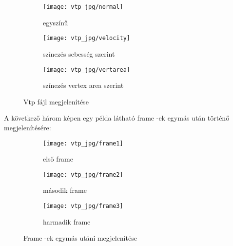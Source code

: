 \begin{figure}[!htb]
    \centering
    \begin{subfigure}[!htb]{0.32\textwidth}
        \centering
        \texttt{[image: vtp\_jpg/normal]}
        \caption{egyszínű}
    \end{subfigure}
    \hfill
    \begin{subfigure}[!htb]{0.32\textwidth}
        \centering
        \texttt{[image: vtp\_jpg/velocity]}
        \caption{színezés sebesség szerint}
    \end{subfigure}
    \hfill
    \begin{subfigure}[!htb]{0.32\textwidth}
        \centering
        \texttt{[image: vtp\_jpg/vertarea]}
        \caption{színezés vertex area szerint}
    \end{subfigure}
    \caption{Vtp fájl megjelenítése}
    \label{fig:x vtpcoloring}
\end{figure}

\clearpage
\noindent A következő három képen egy példa látható 
frame -ek egymás után történő megjelenítésére:

\begin{figure}[!htb]
    \centering
    \begin{subfigure}[!htb]{0.32\textwidth}
        \centering
        \texttt{[image: vtp\_jpg/frame1]}
        \caption{első frame}
    \end{subfigure}
    \hfill
    \begin{subfigure}[!htb]{0.32\textwidth}
        \centering
        \texttt{[image: vtp\_jpg/frame2]}
        \caption{második frame}
    \end{subfigure}
    \hfill
    \begin{subfigure}[!htb]{0.32\textwidth}
        \centering
        \texttt{[image: vtp\_jpg/frame3]}
        \caption{harmadik frame}
    \end{subfigure}
    \caption{Frame -ek egymás utáni megjelenítése}
    \label{fig:x frames}
\end{figure}

